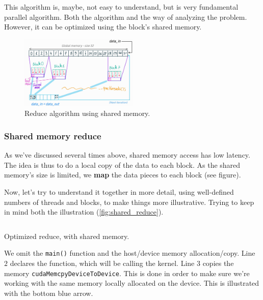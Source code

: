 This algorithm is, maybe, not easy to understand, but is very fundamental parallel algorithm. Both the algorithm and the 
way of analyzing the problem. However, it can be optimized using the block's shared memory.


\begin{figure}
   \vspace{-0.9cm}
   \begin{center}
   \includegraphics[width=0.5\textwidth]{pngs/shared_reduce.jpg}
   \end{center}
   \vspace{-0.5cm}
   \captionsetup{justification=raggedleft}
   \caption{Reduce algorithm using shared memory.}
   \label{fig:shared_reduce}
\end{figure}



\subsubsection*{Shared memory reduce}
\label{subsub:shared_reduce}
As we've discussed several times above, shared memory access has low latency. The idea is thus 
to do a local copy of the data to each block. As the shared memory's size is limited, we \textbf{map} the 
data pieces to each block (see figure).

Now, let's try to understand it together in more detail, using well-defined numbers of threads and blocks, 
to make things more illustrative. Trying to keep in mind both the illustration (\autoref{fig:shared_reduce}).

\begin{listing}[ht!]
\inputminted[frame=single, framesep=1mm, linenos=true]{cuda}{cucodes/shared_rreduced.cu}
\caption{Optimized reduce, with shared memory. \cite{tuomanen2018hands}}
\end{listing}

We omit the \verb|main()| function and the host/device memory allocation/copy.
Line $2$ declares the function, which will be calling the kernel. Line $3$ copies the memory 
\verb|cudaMemcpyDeviceToDevice|. This is done in order to make sure we're working with the same memory locally allocated on the device.
This is illustrated with the bottom blue arrow. 
